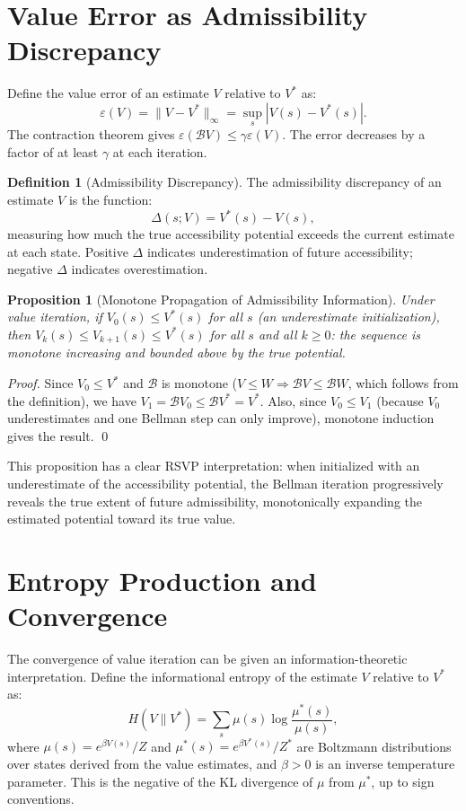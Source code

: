 \documentclass[12pt, a4paper, openany]{book}
\theoremstyle{plain}
\newtheorem{proposition}[theorem]{Proposition}
\theoremstyle{definition}
\newtheorem{definition}[theorem]{Definition}
\theoremstyle{remark}
\newcommand{\BellmanOp}{\mathcal{B}}
\begin{document}
\section{Value Error as Admissibility Discrepancy}

Define the value error of an estimate $V$ relative to $V^*$ as:
\[
\varepsilon(V) = \|V - V^*\|_\infty = \sup_s |V(s) - V^*(s)|.
\]
The contraction theorem gives $\varepsilon(\BellmanOp V) \leq \gamma \varepsilon(V)$. The error decreases by a factor of at least $\gamma$ at each iteration.

\begin{definition}[Admissibility Discrepancy]
The admissibility discrepancy of an estimate $V$ is the function:
\[
\Delta(s; V) = V^*(s) - V(s),
\]
measuring how much the true accessibility potential exceeds the current estimate at each state. Positive $\Delta$ indicates underestimation of future accessibility; negative $\Delta$ indicates overestimation.
\end{definition}

\begin{proposition}[Monotone Propagation of Admissibility Information]
Under value iteration, if $V_0(s) \leq V^*(s)$ for all $s$ (an underestimate initialization), then $V_k(s) \leq V_{k+1}(s) \leq V^*(s)$ for all $s$ and all $k \geq 0$: the sequence is monotone increasing and bounded above by the true potential.
\end{proposition}

\begin{proof}
Since $V_0 \leq V^*$ and $\BellmanOp$ is monotone ($V \leq W \Rightarrow \BellmanOp V \leq \BellmanOp W$, which follows from the definition), we have $V_1 = \BellmanOp V_0 \leq \BellmanOp V^* = V^*$. Also, since $V_0 \leq V_1$ (because $V_0$ underestimates and one Bellman step can only improve), monotone induction gives the result. \qed
\end{proof}

This proposition has a clear RSVP interpretation: when initialized with an underestimate of the accessibility potential, the Bellman iteration progressively reveals the true extent of future admissibility, monotonically expanding the estimated potential toward its true value.

\section{Entropy Production and Convergence}

The convergence of value iteration can be given an information-theoretic interpretation. Define the informational entropy of the estimate $V$ relative to $V^*$ as:
\[
H(V \| V^*) = \sum_s \mu(s) \log \frac{\mu^*(s)}{\mu(s)},
\]
where $\mu(s) = e^{\beta V(s)} / Z$ and $\mu^*(s) = e^{\beta V^*(s)} / Z^*$ are Boltzmann distributions over states derived from the value estimates, and $\beta > 0$ is an inverse temperature parameter. This is the negative of the KL divergence of $\mu$ from $\mu^*$, up to sign conventions.
\end{document}
